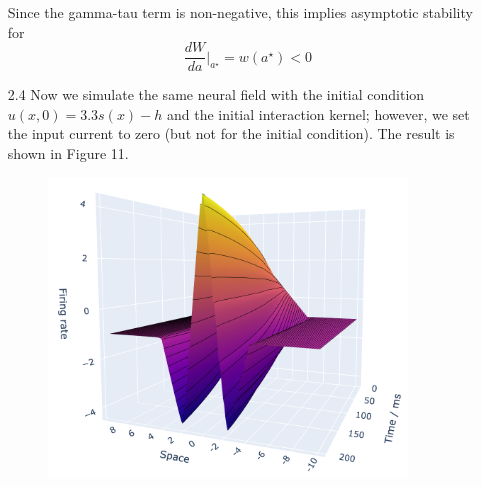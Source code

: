 \documentclass[12pt]{article}
\begin{document}
\begin{enumerate}
\[\]
Since the gamma-tau term is non-negative, this implies asymptotic stability for 
\[
    \frac{dW}{da}\bigg|_{a^{\star}} = w(a^{\star}) < 0
\]
\item[2.4] Now we simulate the same neural field with the initial condition $u(x, 0)=3.3s(x)-h$ and the initial interaction kernel;
however, we set the input current to zero (but not for the initial condition). The result is shown in Figure 11. 
\begin{figure}[H]
    \centering
    \includegraphics[width=0.9\textwidth]{./figure11.png}

\end{figure}
\end{enumerate}
\end{document}
